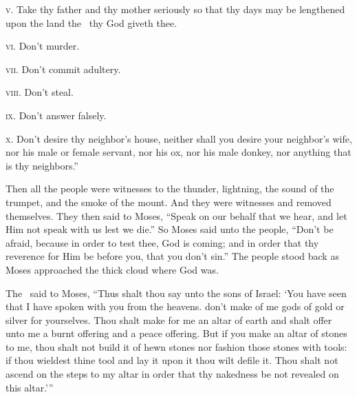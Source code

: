 \begin{inparaenum}
   \textsc{v.} Take thy father and thy mother seriously so that thy days may be lengthened upon the land the \lord\ thy God giveth thee.%

   \textsc{vi.} Don't murder.%

   \textsc{vii.} Don't commit adultery.%

   \textsc{viii.} Don't steal.%

   \textsc{ix.} Don't answer falsely.%

   \textsc{x.} Don't desire thy neighbor's house, neither shall you desire your neighbor's wife, nor his male or female servant, nor his ox, nor his male donkey, nor anything that is thy neighbors.''%

   Then all the people were witnesses to the thunder, lightning, the sound of the trumpet, and the smoke of the mount. And they were witnesses and removed themselves.%
   They then said to Moses, ``Speak on our behalf that we hear, and let Him not speak with us lest we die.''%
   So Moses said unto the people, ``Don't be afraid, because in order to test thee, God is coming; and in order that thy reverence for Him be before you, that you don't sin.''%
   The people stood back as Moses approached the thick cloud where God was.%

   The \lord\ said to Moses, ``Thus shalt thou say unto the sons of Israel: `You have seen that I have spoken with you from the heavens.%
   don't make of me gods of gold or silver for yourselves.%
   Thou shalt make for me an altar of earth and shalt offer unto me a burnt offering and a peace offering.%
   But if you make an altar of stones to me, thou shalt not build it of hewn stones nor fashion those stones with tools: if thou wieldest thine tool and lay it upon it thou wilt defile it.%
   Thou shalt not ascend on the steps to my altar in order that thy nakedness be not revealed on this altar.'\thinspace''%
\end{inparaenum}
